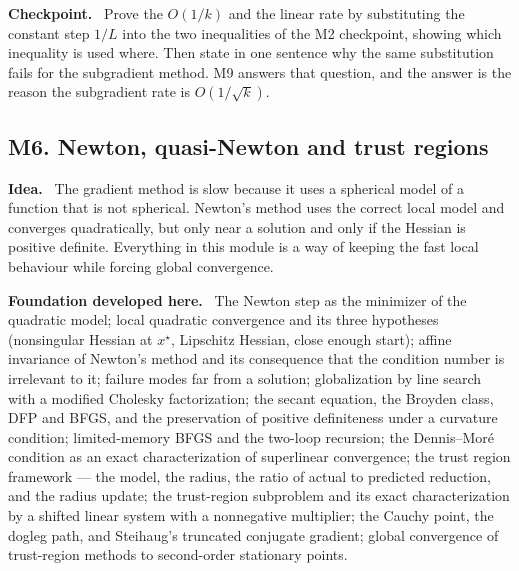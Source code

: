 \documentclass[11pt,a4paper]{article}
\newcommand{\mpart}[1]{\smallskip\noindent\textbf{#1}\ \ignorespaces}
\begin{document}
\mpart{Checkpoint.} Prove the $O(1/k)$ and the linear rate by substituting the constant step
$1/L$ into the two inequalities of the M2 checkpoint, showing which inequality is used where.
Then state in one sentence why the same substitution fails for the subgradient method. M9
answers that question, and the answer is the reason the subgradient rate is $O(1/\sqrt k)$.

\subsection{M6. Newton, quasi-Newton and trust regions}

\mpart{Idea.} The gradient method is slow because it uses a spherical model of a function that
is not spherical. Newton's method uses the correct local model and converges quadratically,
but only near a solution and only if the Hessian is positive definite. Everything in this
module is a way of keeping the fast local behaviour while forcing global convergence.

\mpart{Foundation developed here.} The Newton step as the minimizer of the quadratic model;
local quadratic convergence and its three hypotheses (nonsingular Hessian at $x^\star$,
Lipschitz Hessian, close enough start); affine invariance of Newton's method and its
consequence that the condition number is irrelevant to it; failure modes far from a solution;
globalization by line search with a modified Cholesky factorization; the secant equation, the
Broyden class, DFP and BFGS, and the preservation of positive definiteness under a curvature
condition; limited-memory BFGS and the two-loop recursion; the Dennis--Mor\'e condition as an
exact characterization of superlinear convergence; the trust region framework --- the model,
the radius, the ratio of actual to predicted reduction, and the radius update; the
trust-region subproblem and its exact characterization by a shifted linear system with a
nonnegative multiplier; the Cauchy point, the dogleg path, and Steihaug's truncated conjugate
gradient; global convergence of trust-region methods to second-order stationary points.
\end{document}
